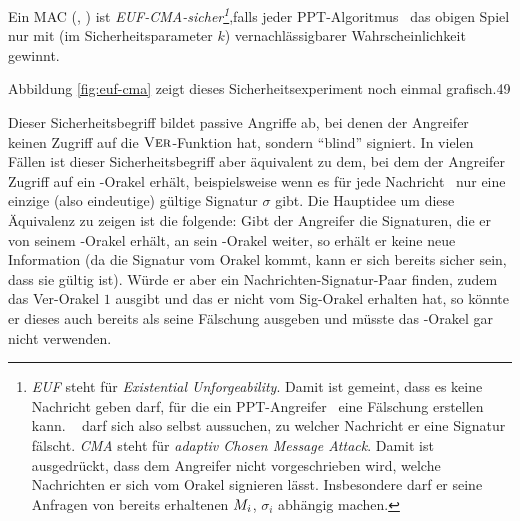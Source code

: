 Ein MAC (\sig, \ver) ist \textit{EUF-CMA-sicher\footnote{\textit{EUF} steht für
    \textit{Existential Unforgeability}. Damit ist gemeint, dass es
    keine Nachricht geben darf, für die ein PPT-Angreifer \A~eine
    Fälschung erstellen kann. \A~ darf sich also selbst aussuchen, zu
    welcher Nachricht er eine Signatur fälscht. \textit{CMA}
    steht für \textit{adaptiv Chosen Message Attack}. Damit ist ausgedrückt,
    dass dem Angreifer nicht vorgeschrieben wird, welche Nachrichten er
    sich vom Orakel signieren lässt. Insbesondere darf er seine Anfragen
    von bereits erhaltenen $M_i$, $\sigma_i$ abhängig machen.}},falls jeder
PPT-Algoritmus \A~das obigen Spiel nur mit (im Sicherheitsparameter $k$)
vernachlässigbarer Wahrscheinlichkeit gewinnt.

Abbildung \ref{fig:euf-cma} zeigt dieses Sicherheitsexperiment noch
einmal grafisch.49

Dieser Sicherheitsbegriff bildet passive Angriffe ab, bei denen der
Angreifer keinen Zugriff auf die $\textsc{Ver}$-Funktion hat, sondern "`blind"'
signiert. In vielen Fällen ist dieser Sicherheitsbegriff aber äquivalent
zu dem, bei dem der Angreifer Zugriff auf ein \ver-Orakel erhält,
beispielsweise wenn es für jede Nachricht \plaint~nur eine einzige (also
eindeutige) gültige Signatur $\sigma$ gibt. Die Hauptidee um diese
Äquivalenz zu zeigen ist die folgende: Gibt der Angreifer die
Signaturen, die er von seinem \sig-Orakel erhält, an sein \ver-Orakel
weiter, so erhält er keine neue Information (da die Signatur vom Orakel
kommt, kann er sich bereits sicher sein, dass sie gültig ist). Würde er
aber ein Nachrichten-Signatur-Paar finden, zudem das Ver-Orakel $1$
ausgibt und das er nicht vom Sig-Orakel erhalten hat, so könnte er
dieses auch bereits als seine Fälschung ausgeben und müsste das
\ver-Orakel gar nicht verwenden.

